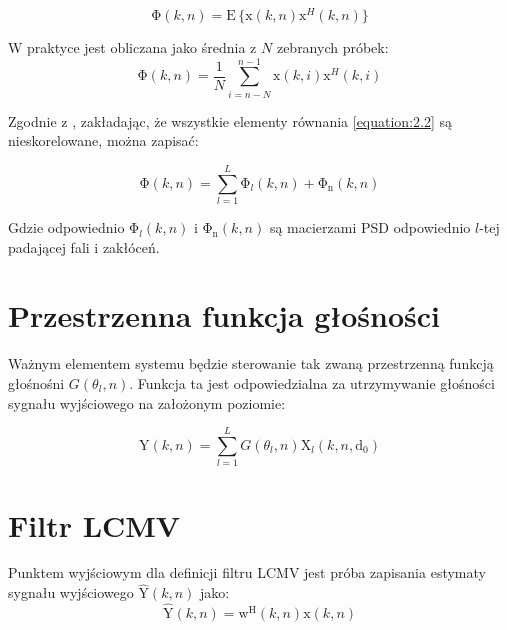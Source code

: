 \begin{equation}
    \label{equation:PSD matrix}
    \mathrm{\Phi}(k,n) = \mathrm{E} \, \{\bm{\mathrm{x}}(k,n) \bm{\mathrm{x}}^{H}(k,n)\}
\end{equation}

W praktyce jest obliczana jako średnia z $N$ zebranych próbek:
\begin{equation}
    \label{equation: PSD in practice}
    \mathrm{\Phi}(k,n)=
    \dfrac{1}{N} \sum_{i = n-N}^{n-1}
    \bm{\mathrm{x}}(k,i) \bm{\mathrm{x}}^{H}(k,i)
\end{equation}

Zgodnie z \cite{Thiergart2013}, zakładając, że wszystkie elementy równania \ref{equation:2.2} są nieskorelowane, można zapisać:

\begin{equation}
    \label{equation:PSD signal noise}
    \bm{\mathrm{\Phi}}(k,n) = 
    \sum_{l=1}^{L} \bm{\mathrm{\Phi}}_{l}(k,n) +
    \bm{\mathrm{\Phi}}_{\mathrm{n}}(k,n)
\end{equation}

Gdzie odpowiednio $\bm{\mathrm{\Phi}}_{l}(k,n)$ i $\bm{\mathrm{\Phi}}_{\mathrm{n}}(k,n)$ są macierzami PSD odpowiednio $l$-tej padającej fali i zakłóceń.

\section{Przestrzenna funkcja głośności}

Ważnym elementem systemu będzie sterowanie tak zwaną przestrzenną funkcją głośnośni $G(\theta_{l},n)$. Funkcja ta jest odpowiedzialna za utrzymywanie głośności sygnału wyjściowego na założonym poziomie:

\begin{equation}
    \label{equation:G}
    \mathrm{Y}(k,n)= 
    \sum_{l=1}^{L} G(\theta_{l},n)
    \mathrm{X}_{l}(k,n,\bm{\mathrm{d}}_0)
\end{equation}

\section{Filtr LCMV}

Punktem wyjściowym dla definicji filtru LCMV jest próba zapisania estymaty sygnału wyjściowego $\hat{\mathrm{Y}}(k,n)$ jako:
\begin{equation}
    \label{equation:Y estimation}
    \hat{\mathrm{Y}}(k,n)=
    \bm{\mathrm{w}}^{\mathrm{H}}(k,n)
    \bm{\mathrm{x}}(k,n)
\end{equation}

